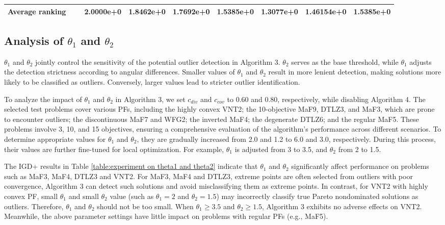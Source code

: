 \documentclass[a4paper,fleqn]{cas-dc}
\begin{document}
\begin{sloppypar}
\begin{table}[h]
{\begin{tabular}{ccccccccc}
				\hline
				Average ranking &~&2.0000e+0	&1.8462e+0	&1.7692e+0	&1.5385e+0	&1.3077e+0	&1.46154e+0	&1.5385e+0\\
				\toprule[0.7pt]
			\end{tabular}
		}
	\end{table}
	\subsection{Analysis of $\theta_1$ and $\theta_2$}
	\par $\theta_1$ and $\theta_2$ jointly control the sensitivity of the potential outlier detection in  Algorithm 3.	$\theta_2$ serves as the base threshold, while $\theta_1$  adjusts the detection strictness according to angular differences. Smaller values of $\theta_1$ and $\theta_2$ result in more  lenient detection, making solutions more likely to be classified as outliers. Conversely, larger values lead to stricter  outlier identification. 	
	\par  To analyze the impact of $\theta_1$ and $\theta_2$ in {Algorithm 3}, we  set $c_{div}$ and $c_{cov}$ to 0.60 and 0.80, respectively, while disabling  {Algorithm 4}.  The selected test problems cover various PFs, including the highly convex VNT2; the 10-objective MaF9, DTLZ3,  and MaF3, which are prone to  encounter outliers; the discontinuous MaF7 and WFG2; the inverted MaF4; the degenerate DTLZ6; and the regular MaF5. These problems involve 3, 10, and 15 objectives, ensuring a comprehensive evaluation of the algorithm’s performance across different scenarios. To determine appropriate values for $\theta_1$ and $\theta_2$,  they are gradually increased from 2.0 and 1.2 to 6.0 and 3.0, respectively. During this process, their values are further fine-tuned for local optimization. For example, $\theta_1$ is adjusted from 3 to 3.5, and $\theta_2$ from 2 to 1.5.
	\par  The  IGD+ results in Table \ref{table:experiment on theta1 and theta2}  indicate that $\theta_1$ and $\theta_2$ significantly affect performance  on problems such as MaF3, MaF4,  DTLZ3 and VNT2. For MaF3, MaF4 and DTLZ3, extreme points are often selected from outliers with poor convergence,   Algorithm {3} can detect such solutions and avoid misclassifying them as extreme points. In contrast, for VNT2 with highly convex PF,   small $\theta_1$ and  small $\theta_2$ value (such as $\theta_1=2$ and $\theta_2=1.5$)  may incorrectly classify true {Pareto nondominated} solutions as outliers. {Therefore, $\theta_1$ and $\theta_2$ should not be too small.} When $\theta_1\geq3.5$ and $\theta_2\geq1.5$, Algorithm {3}  exhibits no adverse effects on VNT2. Meanwhile, the above parameter settings have little  impact on problems with regular PFs {(e.g., MaF5)}.  

\end{sloppypar}
\end{document}

